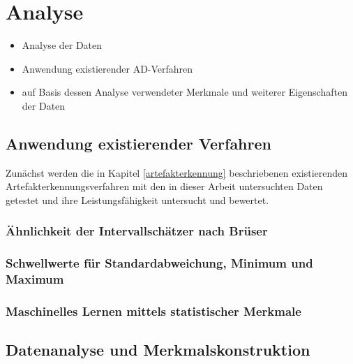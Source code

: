 \chapter{Analyse}\label{analyse}

\begin{itemize}
	\item Analyse der Daten
	\item Anwendung existierender AD-Verfahren
	\item auf Basis dessen Analyse verwendeter Merkmale und weiterer Eigenschaften der Daten	
\end{itemize}


\section{Anwendung existierender Verfahren}

Zunächst werden die in Kapitel \ref{artefakterkennung} beschriebenen existierenden Artefakterkennungsverfahren mit den in dieser Arbeit untersuchten Daten getestet und  ihre Leistungsfähigkeit untersucht und bewertet.

\subsection{Ähnlichkeit der Intervallschätzer nach Brüser}

\subsection{Schwellwerte für Standardabweichung, Minimum und Maximum}

\subsection{Maschinelles Lernen mittels statistischer Merkmale}

\section{Datenanalyse und Merkmalskonstruktion}


